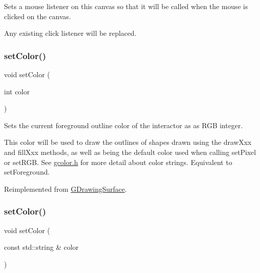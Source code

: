 Sets a mouse listener on this canvas so that it will be called when the mouse is clicked on the canvas. 

Any existing click listener will be replaced. \mbox{\label{classGCanvas_a292eb0ce61f3fdb1d28b17e1e34928f7}} 
\subsubsection{\texorpdfstring{set\+Color()}{setColor()}\hspace{0.1cm}{\footnotesize\ttfamily [1/2]}}
{\footnotesize\ttfamily void set\+Color (\begin{DoxyParamCaption}\item[{int}]{color }\end{DoxyParamCaption})\hspace{0.3cm}{\ttfamily [virtual]}}



Sets the current foreground outline color of the interactor as as R\+GB integer. 

This color will be used to draw the outlines of shapes drawn using the draw\+Xxx and fill\+Xxx methods, as well as being the default color used when calling set\+Pixel or set\+R\+GB. See \mbox{\hyperlink{gcolor_8h_source}{gcolor.\+h}} for more detail about color strings. Equivalent to set\+Foreground. 

Reimplemented from \mbox{\hyperlink{classGDrawingSurface_a75b9cb32ff80bf061791beb01a8433d0}{G\+Drawing\+Surface}}.

\mbox{\label{classGCanvas_ad148324da1b0340e84e24dffa577ffca}} 
\subsubsection{\texorpdfstring{set\+Color()}{setColor()}\hspace{0.1cm}{\footnotesize\ttfamily [2/2]}}
{\footnotesize\ttfamily void set\+Color (\begin{DoxyParamCaption}\item[{const std\+::string \&}]{color }\end{DoxyParamCaption})\hspace{0.3cm}{\ttfamily [virtual]}}



